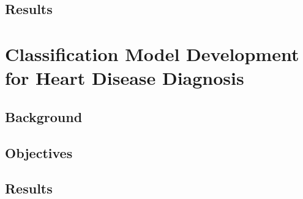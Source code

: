 \documentclass[12pt]{article}
\begin{document}
\subsection{Results}

\newpage

\section{Classification Model Development for Heart Disease Diagnosis}


\subsection{Background}

\subsection{Objectives}

\subsection{Results}

\end{document}
